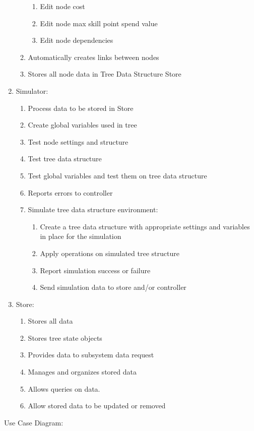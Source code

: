 \documentclass[12pt]{article}
\begin{document}
\begin{enumerate}
\begin{enumerate}
\begin{enumerate}
        \item Edit node cost
        \item Edit node max skill point spend value
        \item Edit node dependencies
      \end{enumerate}
      \item Automatically creates links between nodes
      \item Stores all node data in Tree Data Structure Store
    \end{enumerate}
    \item Simulator:
    \begin{enumerate}
      \item Process data to be stored in Store
      \item Create global variables used in tree
      \item Test node settings and structure
      \item Test tree data structure
      \item Test global variables and test them on tree data structure
      \item Reports errors to controller
      \item Simulate tree data structure environment:
      \begin{enumerate}
        \item Create a tree data structure with appropriate settings and variables in place for the simulation
        \item Apply operations on simulated tree structure
        \item Report simulation success or failure
        \item Send simulation data to store and/or controller
      \end{enumerate}
    \end{enumerate}
    \item Store:
    \begin{enumerate}
      \item Stores all data
      \item Stores tree state objects
      \item Provides data to subsystem data request
      \item Manages and organizes stored data
      \item Allows queries on data.
      \item Allow stored data to be updated or removed
    \end{enumerate}
  \end{enumerate}
  \newline \newline 
  Use Case Diagram:
  
\end{document}
